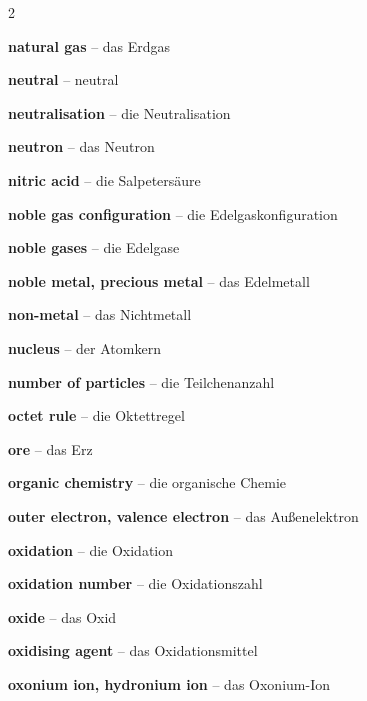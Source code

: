 \begin{multicols}{2}
\par\nopagebreak
\textbf{natural gas} -- das Erdgas\dotfill\hyperref[e:232]{\pageref*{e:232}}\par
\textbf{neutral} -- neutral\dotfill\hyperref[e:156]{\pageref*{e:156}}\par
\textbf{neutralisation} -- die Neutralisation\dotfill\hyperref[e:166]{\pageref*{e:166}}\par
\textbf{neutron} -- das Neutron\dotfill\hyperref[e:75]{\pageref*{e:75}}\par
\textbf{nitric acid} -- die Salpetersäure\dotfill\hyperref[e:180]{\pageref*{e:180}}\par
\textbf{noble gas configuration} -- die Edelgaskonfiguration\dotfill\hyperref[e:96]{\pageref*{e:96}}\par
\textbf{noble gases} -- die Edelgase\dotfill\hyperref[e:91]{\pageref*{e:91}}\par
\textbf{noble metal, precious metal} -- das Edelmetall\dotfill\hyperref[e:192]{\pageref*{e:192}}\par
\textbf{non-metal} -- das Nichtmetall\dotfill\hyperref[e:19]{\pageref*{e:19}}\par
\textbf{nucleus} -- der Atomkern\dotfill\hyperref[e:73]{\pageref*{e:73}}\par
\textbf{number of particles} -- die Teilchenanzahl\dotfill\hyperref[e:251]{\pageref*{e:251}}\par

\par\nopagebreak
\textbf{octet rule} -- die Oktettregel\dotfill\hyperref[e:97]{\pageref*{e:97}}\par
\textbf{ore} -- das Erz\dotfill\hyperref[e:206]{\pageref*{e:206}}\par
\textbf{organic chemistry} -- die organische Chemie\dotfill\hyperref[e:208]{\pageref*{e:208}}\par
\textbf{outer electron, valence electron} -- das Außenelektron\dotfill\hyperref[e:78]{\pageref*{e:78}}\par
\textbf{oxidation} -- die Oxidation\dotfill\hyperref[e:183]{\pageref*{e:183}}\par
\textbf{oxidation number} -- die Oxidationszahl\dotfill\hyperref[e:122]{\pageref*{e:122}}\par
\textbf{oxide} -- das Oxid\dotfill\hyperref[e:188]{\pageref*{e:188}}\par
\textbf{oxidising agent} -- das Oxidationsmittel\dotfill\hyperref[e:186]{\pageref*{e:186}}\par
\textbf{oxonium ion, hydronium ion} -- das Oxonium-Ion\dotfill\hyperref[e:164]{\pageref*{e:164}}\par


\end{multicols}
